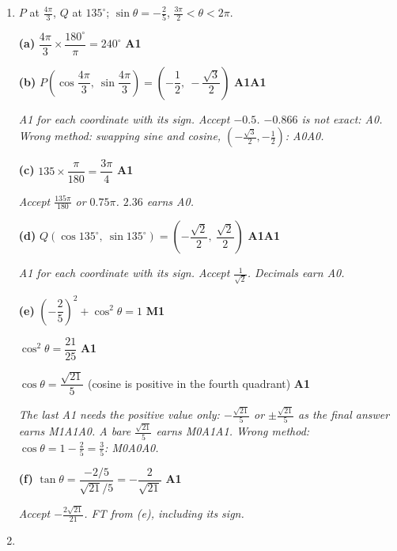\documentclass[12pt, twoside]{article}
\begin{document}
\begin{enumerate}[itemsep=0.3cm]

\item[1.] [Maximum mark: 10]

$P$ at $\frac{4\pi}{3}$, $Q$ at $135^\circ$; $\sin\theta = -\frac{2}{5}$,
$\frac{3\pi}{2} < \theta < 2\pi$.

\textbf{(a)} $\dfrac{4\pi}{3} \times \dfrac{180^\circ}{\pi} = 240^\circ$
\hfill \textbf{A1}

\textbf{(b)} $P\left(\cos\dfrac{4\pi}{3},\ \sin\dfrac{4\pi}{3}\right)
= \left(-\dfrac{1}{2},\ -\dfrac{\sqrt{3}}{2}\right)$ \hfill \textbf{A1A1}

\emph{A1 for each coordinate with its sign. Accept $-0.5$. $-0.866$ is not
exact: A0. Wrong method: swapping sine and cosine,
$\left(-\frac{\sqrt{3}}{2}, -\frac{1}{2}\right)$: A0A0.}

\textbf{(c)} $135 \times \dfrac{\pi}{180} = \dfrac{3\pi}{4}$ \hfill \textbf{A1}

\emph{Accept $\frac{135\pi}{180}$ or $0.75\pi$. $2.36$ earns A0.}

\textbf{(d)} $Q\left(\cos 135^\circ,\ \sin 135^\circ\right)
= \left(-\dfrac{\sqrt{2}}{2},\ \dfrac{\sqrt{2}}{2}\right)$ \hfill \textbf{A1A1}

\emph{A1 for each coordinate with its sign. Accept $\frac{1}{\sqrt{2}}$.
Decimals earn A0.}

\textbf{(e)} $\left(-\dfrac{2}{5}\right)^{2} + \cos^{2}\theta = 1$
\hfill \textbf{M1}

$\cos^{2}\theta = \dfrac{21}{25}$ \hfill \textbf{A1}

$\cos\theta = \dfrac{\sqrt{21}}{5}$ \quad (cosine is positive in the fourth
quadrant) \hfill \textbf{A1}

\emph{The last A1 needs the positive value only: $-\frac{\sqrt{21}}{5}$ or
$\pm\frac{\sqrt{21}}{5}$ as the final answer earns M1A1A0. A bare
$\frac{\sqrt{21}}{5}$ earns M0A1A1. Wrong method:
$\cos\theta = 1 - \frac{2}{5} = \frac{3}{5}$: M0A0A0.}

\textbf{(f)} $\tan\theta = \dfrac{-2/5}{\sqrt{21}/5} = -\dfrac{2}{\sqrt{21}}$
\hfill \textbf{A1}

\emph{Accept $-\frac{2\sqrt{21}}{21}$. FT from (e), including its sign.}

\newpage

\item[2.] [Maximum mark: 9]


\end{enumerate}
\end{document}
